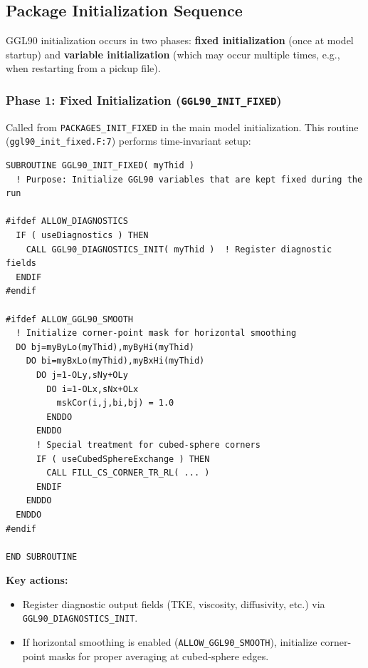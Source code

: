 \documentclass[12pt,letterpaper]{article}
\begin{document}
\subsection{Package Initialization Sequence}

GGL90 initialization occurs in two phases: \textbf{fixed initialization} (once
at model startup) and \textbf{variable initialization} (which may occur multiple
times, e.g., when restarting from a pickup file).

\subsubsection{Phase 1: Fixed Initialization (\texttt{GGL90\_INIT\_FIXED})}

Called from \texttt{PACKAGES\_INIT\_FIXED} in the main model initialization.
This routine (\texttt{ggl90\_init\_fixed.F:7}) performs time-invariant setup:

\begin{lstlisting}[caption={\texttt{ggl90\_init\_fixed.F}, lines 7--44 -- Fixed initialization.}]
SUBROUTINE GGL90_INIT_FIXED( myThid )
  ! Purpose: Initialize GGL90 variables that are kept fixed during the run

#ifdef ALLOW_DIAGNOSTICS
  IF ( useDiagnostics ) THEN
    CALL GGL90_DIAGNOSTICS_INIT( myThid )  ! Register diagnostic fields
  ENDIF
#endif

#ifdef ALLOW_GGL90_SMOOTH
  ! Initialize corner-point mask for horizontal smoothing
  DO bj=myByLo(myThid),myByHi(myThid)
    DO bi=myBxLo(myThid),myBxHi(myThid)
      DO j=1-OLy,sNy+OLy
        DO i=1-OLx,sNx+OLx
          mskCor(i,j,bi,bj) = 1.0
        ENDDO
      ENDDO
      ! Special treatment for cubed-sphere corners
      IF ( useCubedSphereExchange ) THEN
        CALL FILL_CS_CORNER_TR_RL( ... )
      ENDIF
    ENDDO
  ENDDO
#endif

END SUBROUTINE
\end{lstlisting}

\textbf{Key actions:}
\begin{itemize}[leftmargin=*]
  \item Register diagnostic output fields (TKE, viscosity, diffusivity, etc.)
        via \texttt{GGL90\_DIAGNOSTICS\_INIT}.
  \item If horizontal smoothing is enabled (\texttt{ALLOW\_GGL90\_SMOOTH}),
        initialize corner-point masks for proper averaging at cubed-sphere
        edges.
\end{itemize}
\end{document}
